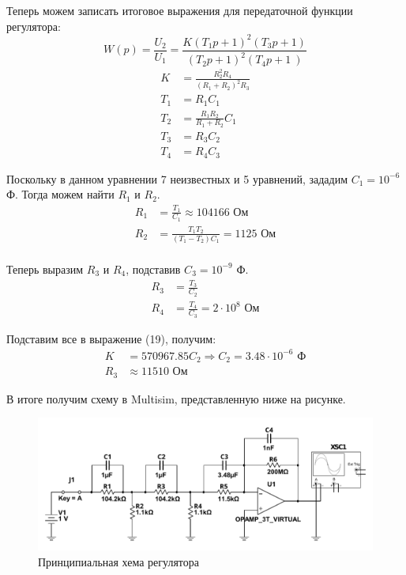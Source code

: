 \documentclass[russian, utf8]{eskdtext}
\begin{document}
Теперь можем записать итоговое выражения для передаточной функции регулятора:
\begin{equation}
    W(p) = \frac{U_2}{U_1} = \frac{K\left(T_1p + 1 \right)^2 \left( T_3p + 1 \right)}{\left( T_2p + 1 \right)^2 \left( T_4p + 1 \ \right)} 
\end{equation}
\begin{align}
    K & = \frac{R_2^2R_4}{(R_1 + R_2)^2R_3} \\
    T_1 & = R_1C_1 \\
    T_2 & = \frac{R_1R_2}{R_1 + R_2}C_1 \\
    T_3 & = R_3C_2 \\
    T_4 & = R_4C_3
\end{align}

\newpage
Поскольку в данном уравнении 7 неизвестных и 5 уравнений, зададим $C_1 = 10^{-6}$ Ф. Тогда можем найти $R_1$ и $R_2$.
\begin{align*}
    R_1 & = \frac{T_1}{C_1} \approx 104166 \text{ Ом}\\
    R_2 & = \frac{T_1T_2}{(T_1 - T_2)C_1} = 1125 \text{ Ом}\\
\end{align*}

Теперь выразим $R_3$ и $R_4$, подставив $C_3 = 10^{-9}$ Ф.
\begin{align*}
    R_3 & = \frac{T_3}{C_2} \\
    R_4 & = \frac{T_4}{C_3} = 2\cdot 10^8 \text{ Ом}
\end{align*}

Подставим все в выражение (19), получим:
\begin{align*}
    K & = 570967.85C_2 \Rightarrow C_2 = 3.48 \cdot 10^{-6} \text{ Ф}\\
    R_3 & \approx 11510 \text{ Ом}
\end{align*}

В итоге получим схему в Multisim, представленную ниже на рисунке.

\begin{figure}[h!]
    \centering
    \includegraphics{images/ElectricScheme.pdf}
    \caption{Принципиальная хема регулятора}
\end{figure}
\end{document}
